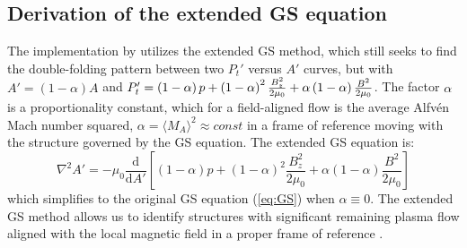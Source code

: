 \subsection{Derivation of the extended GS equation}
The implementation by \cite{Chen:2021} utilizes the extended GS method, which still seeks to find the double-folding pattern between two $P_t'$ versus $A'$ curves, but with $A'=(1-\alpha)A$ and $P_t'=\left( 1-\alpha \right)p + \left( 1-\alpha \right)^2\frac{B_z^2}{2\mu_0} + \alpha\left( 1-\alpha \right)\frac{B^2}{2\mu_0}$.  The factor $\alpha$ is a proportionality constant, which for a field-aligned flow is the average Alfv\'en Mach number squared, $\alpha=\langle M_A\rangle^2 \approx const$ in a frame of reference moving with the structure governed by the GS equation. The extended GS equation \citep{Teh:2018, Sonnerup:2006} is:
\begin{equation}
    \nabla^2 A' = -\mu_0\frac{\mathrm{d}}{\mathrm{d}A'}\left[\left(1-\alpha\right)p + \left(1-\alpha\right)^2\frac{B_z^2}{2\mu_0} + \alpha\left(1-\alpha\right)\frac{B^2}{2\mu_0} \right]
    \label{eq:GSextended}
\end{equation}
which simplifies to the original GS equation (\ref{eq:GS}) when $\alpha\equiv 0$. The extended GS method allows us to identify structures with significant remaining plasma ﬂow aligned with the local magnetic field in a proper frame of reference \citep{Chen:2022}.

